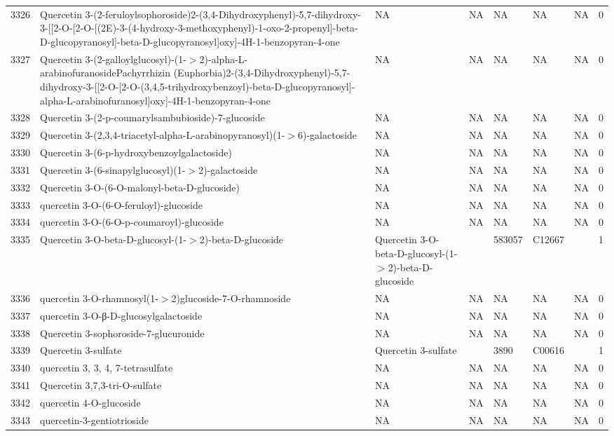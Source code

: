 \documentclass[a4paper]{article}
\begin{document}
\begin{longtable}{rlllllll}
  3326 & Quercetin 3-(2-feruloylsophoroside)2-(3,4-Dihydroxyphenyl)-5,7-dihydroxy-3-[[2-O-[2-O-[(2E)-3-(4-hydroxy-3-methoxyphenyl)-1-oxo-2-propenyl]-beta-D-glucopyranosyl]-beta-D-glucopyranosyl]oxy]-4H-1-benzopyran-4-one & NA & NA & NA & NA & NA & 0 \\ 
  3327 & Quercetin 3-(2-galloylglucosyl)-(1-$>$2)-alpha-L-arabinofuranosidePachyrrhizin (Euphorbia)2-(3,4-Dihydroxyphenyl)-5,7-dihydroxy-3-[[2-O-[2-O-(3,4,5-trihydroxybenzoyl)-beta-D-glucopyranosyl]-alpha-L-arabinofuranosyl]oxy]-4H-1-benzopyran-4-one & NA & NA & NA & NA & NA & 0 \\ 
  3328 & Quercetin 3-(2-p-coumarylsambubioside)-7-glucoside & NA & NA & NA & NA & NA & 0 \\ 
  3329 & Quercetin 3-(2,3,4-triacetyl-alpha-L-arabinopyranosyl)(1-$>$6)-galactoside & NA & NA & NA & NA & NA & 0 \\ 
  3330 & Quercetin 3-(6-p-hydroxybenzoylgalactoside) & NA & NA & NA & NA & NA & 0 \\ 
  3331 & Quercetin 3-(6-sinapylglucosyl)(1-$>$2)-galactoside & NA & NA & NA & NA & NA & 0 \\ 
  3332 & Quercetin 3-O-(6-O-malonyl-beta-D-glucoside) & NA & NA & NA & NA & NA & 0 \\ 
  3333 & quercetin 3-O-(6-O-feruloyl)-glucoside & NA & NA & NA & NA & NA & 0 \\ 
  3334 & quercetin 3-O-(6-O-p-coumaroyl)-glucoside & NA & NA & NA & NA & NA & 0 \\ 
  3335 & Quercetin 3-O-beta-D-glucosyl-(1-$>$2)-beta-D-glucoside & Quercetin 3-O-beta-D-glucosyl-(1-$>$2)-beta-D-glucoside &  & 583057 & C12667 &  & 1 \\ 
  3336 & quercetin 3-O-rhamnosyl(1-$>$2)glucoside-7-O-rhamnoside & NA & NA & NA & NA & NA & 0 \\ 
  3337 & quercetin 3-O-β-D-glucosylgalactoside & NA & NA & NA & NA & NA & 0 \\ 
  3338 & Quercetin 3-sophoroside-7-glucuronide & NA & NA & NA & NA & NA & 0 \\ 
  3339 & Quercetin 3-sulfate & Quercetin 3-sulfate &  & 3890 & C00616 &  & 1 \\ 
  3340 & quercetin 3, 3, 4, 7-tetrasulfate & NA & NA & NA & NA & NA & 0 \\ 
  3341 & Quercetin 3,7,3-tri-O-sulfate & NA & NA & NA & NA & NA & 0 \\ 
  3342 & quercetin 4-O-glucoside & NA & NA & NA & NA & NA & 0 \\ 
  3343 & quercetin-3-gentiotrioside & NA & NA & NA & NA & NA & 0 \\ 

\end{longtable}
\end{document}
